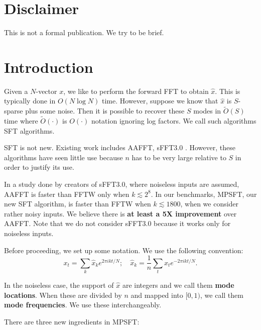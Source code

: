 \documentclass[10pt]{article}
\begin{document}
\pagestyle{plain}
\maketitle

\section*{Disclaimer}
This is not a formal publication. We try to be brief.

\section{Introduction}
Given a $N$-vector $x$, we like to perform the forward FFT to obtain $\hat{x}$. This is typically done in $O(N \log N)$ time. However, suppose we know that $\hat{x}$ is $S$-sparse plus some noise. Then it is possible to recover these $S$ modes in $\tilde{O}(S)$ time where $\tilde{O}(\cdot)$ is $O(\cdot)$ notation ignoring log factors. We call such algorithms SFT algorithms.

SFT is not new. Existing work includes AAFFT\cite{iwen2007empirical}, sFFT3.0 \cite{hassanieh2012simple, hassanieh2012nearly}. However, these algorithms have seen little use because $n$ has to be very large relative to $S$ in order to justify its use.

In a study done by creators of sFFT3.0, where noiseless inputs are assumed, AAFFT is faster than FFTW only when $k\lesssim 2^8$. In our benchmarks, MPSFT, our new SFT algorithm, is faster than FFTW when $k \lesssim 1800$, when we consider rather noisy inputs. We believe there is \textbf{at least a 5X improvement} over AAFFT. Note that we do not consider sFFT3.0 because it works only for noiseless inputs.

Before proceeding, we set up some notation. We use the following convention:
$$x_t = \sum_k \hat{x}_k e^{2\pi i kt/N}; \quad \hat{x}_k =\frac{1}{n} \sum_t x_t e^{-2\pi i k t/N}.$$

In the noiseless case, the support of $\hat{x}$ are integers and we call them \textbf{mode locations}. When these are divided by $n$ and mapped into $[0,1)$, we call them \textbf{mode frequencies}. We use these interchangeably.

There are three new ingredients in MPSFT:
\end{document}
